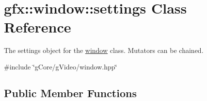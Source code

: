 \hypertarget{classgfx_1_1window_1_1settings}{\section{gfx\-:\-:window\-:\-:settings Class Reference}
\label{classgfx_1_1window_1_1settings}
}


The settings object for the \hyperlink{classgfx_1_1window}{window} class. Mutators can be chained.  




{\ttfamily \#include \char`\"{}g\-Core/g\-Video/window.\-hpp\char`\"{}}

\subsection*{Public Member Functions}
